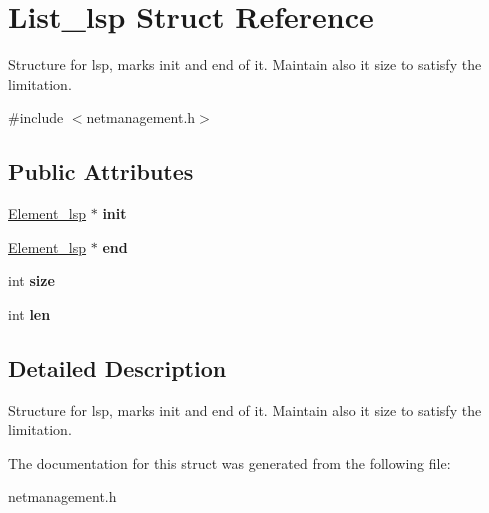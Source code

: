 \hypertarget{structList__lsp}{\section{\-List\-\_\-lsp \-Struct \-Reference}
\label{structList__lsp}
}


\-Structure for lsp, marks init and end of it. \-Maintain also it size to satisfy the limitation.  




{\ttfamily \#include $<$netmanagement.\-h$>$}

\subsection*{\-Public \-Attributes}
\begin{DoxyCompactItemize}
\item 
\hypertarget{structList__lsp_a59ba38c7d0b7a68cd813cebc849427d7}{\hyperlink{structElementList__lsp}{\-Element\-\_\-lsp} $\ast$ {\bfseries init}}\label{structList__lsp_a59ba38c7d0b7a68cd813cebc849427d7}

\item 
\hypertarget{structList__lsp_a086882cb636f9c151ea9c57f9b2022c1}{\hyperlink{structElementList__lsp}{\-Element\-\_\-lsp} $\ast$ {\bfseries end}}\label{structList__lsp_a086882cb636f9c151ea9c57f9b2022c1}

\item 
\hypertarget{structList__lsp_a7f4a651be868f18fac2a85d3784407d5}{int {\bfseries size}}\label{structList__lsp_a7f4a651be868f18fac2a85d3784407d5}

\item 
\hypertarget{structList__lsp_a3a1442c9b2ee2a8b654e5fb5355d411c}{int {\bfseries len}}\label{structList__lsp_a3a1442c9b2ee2a8b654e5fb5355d411c}

\end{DoxyCompactItemize}


\subsection{\-Detailed \-Description}
\-Structure for lsp, marks init and end of it. \-Maintain also it size to satisfy the limitation. 

\-The documentation for this struct was generated from the following file\-:\begin{DoxyCompactItemize}
\item 
netmanagement.\-h\end{DoxyCompactItemize}
